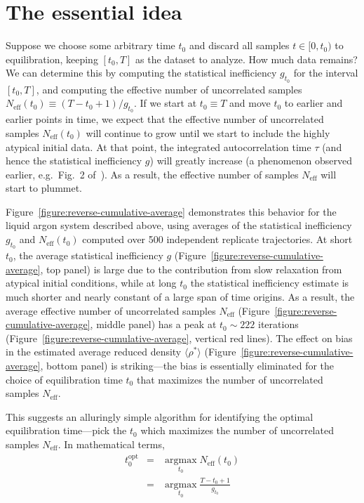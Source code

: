 \documentclass[aps,pre,twocolumn,nofootinbib,superscriptaddress,linenumbers,11point]{revtex4-1}
\newcommand{\expect}[1]{\langle #1 \rangle}                %
\DeclareMathOperator*{\argmax}{argmax}
\newcommand*{\argmaxl}{\argmax\limits}
\begin{document}
\section*{The essential idea}
\label{section:the-idea}

Suppose we choose some arbitrary time $t_0$ and discard all samples $t \in [0, t_0)$ to equilibration, keeping $[t_0, T]$ as the dataset to analyze.
How much data remains?
We can determine this by computing the statistical inefficiency $g_{t_0}$ for the interval $[t_0, T]$, and computing the effective number of uncorrelated samples $N_\mathrm{eff}(t_0) \equiv (T - t_0 + 1) / g_{t_0}$.
If we start at $t_0 \equiv T$ and move $t_0$ to earlier and earlier points in time, we expect that the effective number of uncorrelated samples $N_\mathrm{eff}(t_0)$ will continue to grow until we start to include the highly atypical initial data.
At that point, the integrated autocorrelation time $\tau$ (and hence the statistical inefficiency $g$) will greatly increase (a phenomenon observed earlier, e.g.~Fig.~2 of~\cite{yang-karplus:2004:jcp:reverse-cumulative-averaging}).
As a result, the effective number of samples $N_\mathrm{eff}$ will start to plummet.

Figure~\ref{figure:reverse-cumulative-average} demonstrates this behavior for the liquid argon system described above, using averages of the statistical inefficiency $g_{t_0}$ and $N_\mathrm{eff}(t_0)$ computed over 500 independent replicate trajectories.
At short $t_0$, the average statistical inefficiency $g$ (Figure~\ref{figure:reverse-cumulative-average}, top panel) is large due to the contribution from slow relaxation from atypical initial conditions, while at long $t_0$ the statistical inefficiency estimate is much shorter and nearly constant of a large span of time origins.
As a result, the average effective number of uncorrelated samples $N_\mathrm{eff}$ (Figure~\ref{figure:reverse-cumulative-average}, middle panel) has a peak at $t_0 \sim 222$ iterations (Figure~\ref{figure:reverse-cumulative-average}, vertical red lines).
The effect on bias in the estimated average reduced density $\expect{\rho^*}$ (Figure~\ref{figure:reverse-cumulative-average}, bottom panel) is striking---the bias is essentially eliminated for the choice of equilibration time $t_0$ that maximizes the number of uncorrelated samples $N_\mathrm{eff}$.

This suggests an alluringly simple algorithm for identifying the optimal equilibration time---pick the $t_0$ which maximizes the number of uncorrelated samples $N_\mathrm{eff}$.
In mathematical terms, 
\begin{eqnarray}
t_0^\mathrm{opt} &=& \argmaxl_{t_0} N_\mathrm{eff}(t_0) \label{equation:optimal-equilibration-time} \\
&=& \argmaxl_{t_0}  \frac{T - t_0 + 1}{g_{t_0}}
\end{eqnarray}
\end{document}
